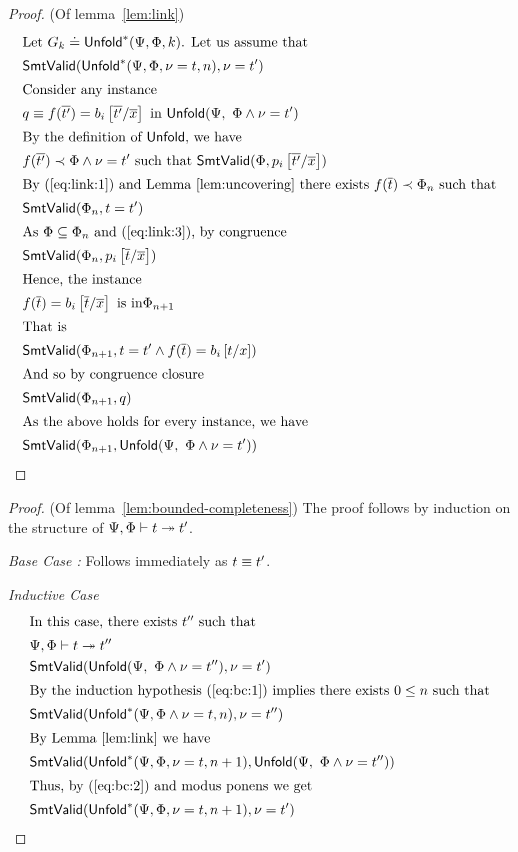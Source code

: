 \begin{proof} (Of lemma~\ref{lem:link})
%
\begin{align}
\intertext{Let $G_k \doteq \binst{\Renv}{\Penv}{k}$. Let us assume that}
  & \smtIsValid{\binst{\Renv}{\Penv, \vv = \expr}{n}}{\vv = \expr'}
  \label{eq:link:1} \\
\intertext{Consider any instance}
  & \predb \equiv \fapp{\rfun}{t'} = \SUBSTS{\body_i}{x}{t'} \ \mbox{in}\ \uinst{\Renv}{\Penv \wedge \vv = \expr'}
  \label{eq:link:2} \\
\intertext{By the definition of \uinstsym, we have}
  & \issubterm{\fapp{\rfun}{t'}}{\Penv \wedge \vv = \expr'}
    \ \mbox{such that}\ \smtIsValid{\Penv}{\SUBSTS{\pred_i}{x}{t'}}
    \label{eq:link:3} \\
\intertext{By (\ref{eq:link:1}) and Lemma~\ref{lem:uncovering}
  there exists \issubterm{\fapp{\rfun}{t}}{\Penv_n} such that}
  & \smtIsValid{\Penv_n}{t = t'} \notag \\
\intertext{As $\Penv \subseteq \Penv_n$ and (\ref{eq:link:3}), by congruence}
  & \smtIsValid{\Penv_n}{\SUBSTS{\pred_i}{x}{t}} \notag \\
\intertext{Hence, the instance}
 & \fapp{\rfun}{t} = \SUBSTS{\body_i}{x}{t} \ \mbox{is in} \Penv_{n+1} \notag \\
\intertext{That is}
 & \smtIsValid{\Penv_{n+1}}{t = t' \wedge \fapp{\rfun}{t} = \SUBST{\body_i}{x}{t}} \notag \\
\intertext{And so by congruence closure}
 & \smtIsValid{\Penv_{n+1}}{\predb} \notag \\
\intertext{As the above holds for every instance, we have}
 & \smtIsValid{\Penv_{n+1}}{\uinst{\Renv}{\Penv \wedge \vv = \expr'}} \notag
\end{align}
\end{proof}

\begin{proof} (Of lemma~\ref{lem:bounded-completeness})
%
The proof follows by induction on the structure
of $\Psi, \Phi \vdash t \twoheadrightarrow t'$.

\smallskip \emph{Base Case :}
Follows immediately as $t \equiv t'$.

\smallskip \emph{Inductive Case }
\begin{align}
\intertext{In this case, there exists $t''$ such that}
  & \Psi, \Phi \vdash t \twoheadrightarrow t''
    \label{eq:bc:1} \\
  & \mathsf{SmtValid}(\mathsf{Unfold}(\Psi,\ \Phi \wedge \nu = t''), \nu = t')
    \label{eq:bc:2} \\
\intertext{By the induction hypothesis (\ref{eq:bc:1}) implies there exists $0 \leq n$ such that}
  & \mathsf{SmtValid}(\mathsf{Unfold}^{*}(\Psi,\Phi \wedge \nu = t,n), \nu = t'')
    \notag \\
\intertext{By Lemma~\ref{lem:link} we have}
  & \mathsf{SmtValid}(\mathsf{Unfold}^{*}(\Psi,\Phi, \nu = t,n+1), \mathsf{Unfold}(\Psi,\ \Phi \wedge \nu = t''))
    \notag \\
\intertext{Thus, by (\ref{eq:bc:2}) and modus ponens we get}
  & \mathsf{SmtValid}(\mathsf{Unfold}^{*}(\Psi,\Phi, \nu = t,n+1), \nu = t') \notag
\end{align}
\end{proof}


